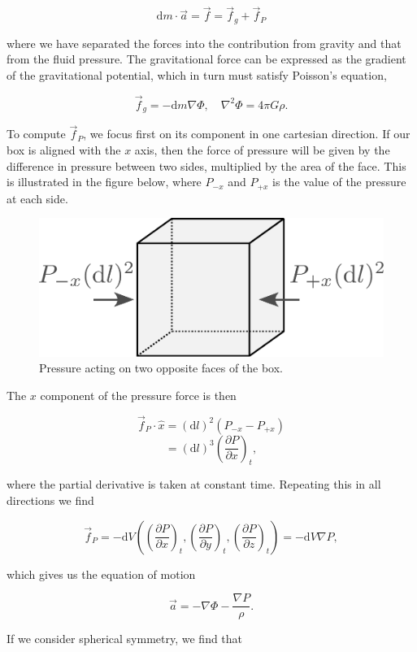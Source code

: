 \documentclass[twocolumn]{article}
\begin{document}
\[\mathrm{d}m\cdot \vec{a}=\vec{f}=\vec{f}_g + \vec{f}_P\]

where we have separated the forces into the contribution from gravity
and that from the fluid pressure. The gravitational force can be
expressed as the gradient of the gravitational potential, which in turn
must satisfy Poisson's equation,

\[\vec{f}_g=-\mathrm{d}m\nabla\Phi,\quad \nabla^2\Phi = 4\pi G \rho.\]

To compute \(\vec{f}_P\), we focus first on its component in one
cartesian direction. If our box is aligned with the \(x\) axis, then the
force of pressure will be given by the difference in pressure between
two sides, multiplied by the area of the face. This is illustrated in
the figure below, where \(P_{-x}\) and \(P_{+x}\) is the value of the
pressure at each side.

\begin{figure}
\centering
\includegraphics{../assets/2_equations/pressure.pdf}
\caption{Pressure acting on two opposite faces of the box.}
\end{figure}

The \(x\) component of the pressure force is then

\[\vec{f}_P\cdot \hat{x}=(\mathrm{d}l)^2\left(P_{-x}-P_{+x}\right)\]
\[= (\mathrm{d}l)^3 \left(\frac{\partial P}{\partial x}\right)_t,\]

where the partial derivative is taken at constant time. Repeating this
in all directions we find

\[\vec{f}_P = -\mathrm{d} V\left(\left(\frac{\partial P}{\partial x}\right)_t, \left(\frac{\partial P}{\partial y}\right)_t, \left(\frac{\partial P}{\partial z}\right)_t\right)=-\mathrm{d}V \nabla P,\]

which gives us the equation of motion

\[\vec{a}=-\nabla\Phi -\frac{\nabla P}{\rho}.\]

If we consider spherical symmetry, we find that
\end{document}
